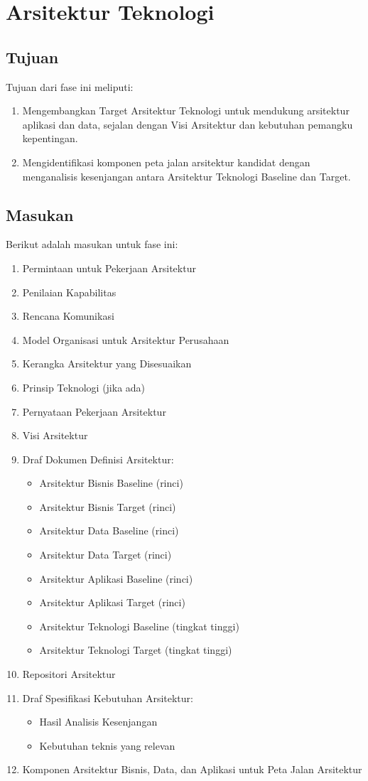 \chapter{Arsitektur Teknologi}

\section{Tujuan}
Tujuan dari fase ini meliputi:
\begin{enumerate}
	\item Mengembangkan Target Arsitektur Teknologi untuk mendukung arsitektur aplikasi dan data, sejalan dengan Visi Arsitektur dan kebutuhan pemangku kepentingan.
	\item Mengidentifikasi komponen peta jalan arsitektur kandidat dengan menganalisis kesenjangan antara Arsitektur Teknologi Baseline dan Target.
\end{enumerate}

\section{Masukan}
Berikut adalah masukan untuk fase ini:
\begin{enumerate}
	\item Permintaan untuk Pekerjaan Arsitektur
	\item Penilaian Kapabilitas
	\item Rencana Komunikasi
	\item Model Organisasi untuk Arsitektur Perusahaan
	\item Kerangka Arsitektur yang Disesuaikan
	\item Prinsip Teknologi (jika ada)
	\item Pernyataan Pekerjaan Arsitektur
	\item Visi Arsitektur
	\item Draf Dokumen Definisi Arsitektur:
	\begin{itemize}
		\item Arsitektur Bisnis Baseline (rinci)
		\item Arsitektur Bisnis Target (rinci)
		\item Arsitektur Data Baseline (rinci)
		\item Arsitektur Data Target (rinci)
		\item Arsitektur Aplikasi Baseline (rinci)
		\item Arsitektur Aplikasi Target (rinci)
		\item Arsitektur Teknologi Baseline (tingkat tinggi)
		\item Arsitektur Teknologi Target (tingkat tinggi)
	\end{itemize}
	\item Repositori Arsitektur
	\item Draf Spesifikasi Kebutuhan Arsitektur:
	\begin{itemize}
		\item Hasil Analisis Kesenjangan
		\item Kebutuhan teknis yang relevan
	\end{itemize}
	\item Komponen Arsitektur Bisnis, Data, dan Aplikasi untuk Peta Jalan Arsitektur
\end{enumerate}

